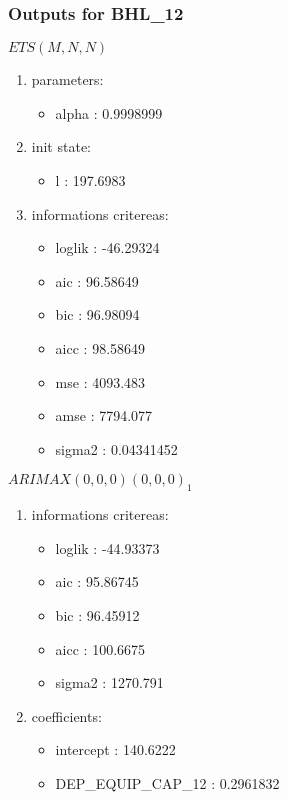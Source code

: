\documentclass[10pt,a4paper]{article}\usepackage[]{graphicx}\usepackage[]{color}
\newcommand{\AaA}{\_}
\begin{document}
\subsubsection{Outputs for BHL\AaA 12}
\begin{multicols}{2}


$ ETS(M,N,N) $
\begin{enumerate}
\item parameters:
\begin{itemize}
\item  alpha :  0.9998999 
\end{itemize}
\item init state:
\begin{itemize}
\item  l :  197.6983 
\end{itemize}
\item informations critereas:
\begin{itemize}
\item  loglik :  -46.29324 
\item  aic :  96.58649 
\item  bic :  96.98094 
\item  aicc :  98.58649 
\item  mse :  4093.483 
\item  amse :  7794.077 
\item  sigma2 :  0.04341452 
\end{itemize}
\end{enumerate}

\columnbreak


 $ARIMAX(0,0,0)(0,0,0)_{1}$ 
\begin{enumerate}
\item informations critereas:
\begin{itemize}
\item  loglik :  -44.93373 
\item  aic :  95.86745 
\item  bic :  96.45912 
\item  aicc :  100.6675 
\item  sigma2 :  1270.791 
\end{itemize}

\item coefficients:
\begin{itemize}
\item  intercept :  140.6222 
\item  DEP\AaA EQUIP\AaA CAP\AaA 12 :  0.2961832 
\end{itemize}
\end{enumerate}
\end{multicols}
\end{document}
